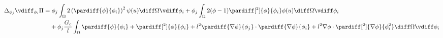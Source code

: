 \documentclass{mitschrift}
\begin{document}
\begin{align}
    \Delta_{\phi_j} \vdiff_{\phi_i} \Pi &= \phi_j \int_\Omega 2\left(\pardiff{\phi}{\phi_i}\right)^2 \psi(u) \diff \Omega \vdiff \phi_i 
    + \phi_j \int_\Omega 2(\phi -1 )\pardiff[^2]{\phi}{\phi_i} \phi(u) \diff \Omega \vdiff \phi_i \\
&\phantom{={}} +\phi_j \frac{G_c}{l} \int_\Omega \pardiff{\phi}{\phi_i} + \pardiff[^2]{\phi}{\phi_i} + l^2 \pardiff{\nabla \phi}{\phi_j} \cdot \pardiff{\nabla \phi}{\phi_i} + l^2 \nabla \phi \cdot \pardiff[^2]{\nabla \phi}{\phi_i^2} \diff \Omega \vdiff \phi_i
\end{align}
\end{document}
